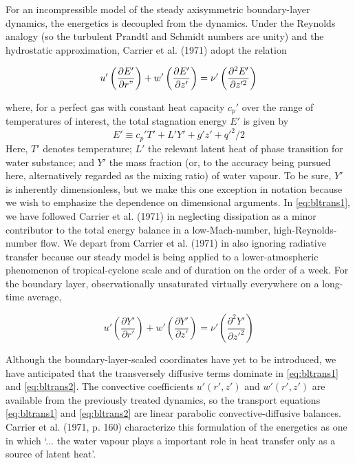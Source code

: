 \documentclass[preprint, prX]{revtex4}
\newcommand{\ppd}[2]{\left(\frac{\partial#1}{\partial#2}\right)}
\begin{document}
For an incompressible model of the steady axisymmetric boundary-layer dynamics, the energetics is decoupled from the dynamics. Under the Reynolds analogy (so the turbulent Prandtl and Schmidt numbers are unity) and the hydrostatic approximation, Carrier et al. (1971) adopt the relation

\begin{equation}
u' \ppd{E'}{r"} + w' \ppd{E'}{z'} = \nu'\left( \frac{\partial^2 E'}{\partial z'^2}\right )
\label{eq:bltrans1}
\end{equation}

where, for a perfect gas with constant heat capacity $c_p'$ over the range of temperatures of interest, the total stagnation energy $E'$ is given by
\begin{equation}
E'\equiv c_p'T'+L'Y' + g'z' + q'^2 /2
\end{equation}
Here, $T'$ denotes temperature; $L'$ the relevant latent heat of phase transition for water substance; and $Y'$ the mass fraction (or, to the accuracy being pursued here, alternatively regarded as the mixing ratio) of water vapour. To be sure, $Y'$ is inherently dimensionless, but we make this one exception in notation because we wish to emphasize the dependence on dimensional arguments. In \eqref{eq:bltrans1}, we have followed Carrier et al. (1971) in neglecting dissipation as a minor contributor to the total energy balance in a low-Mach-number, high-Reynolds-number flow. We depart from Carrier et al. (1971) in also ignoring radiative transfer because our steady model is being applied to a lower-atmospheric phenomenon of tropical-cyclone scale and of duration on the order of a week. For the boundary layer, observationally unsaturated virtually everywhere on a long-time average,

\begin{equation}
u' \ppd{Y'}{r'} + w'\ppd{Y'}{z'} = \nu'\left( \frac{\partial^2 Y'}{\partial z'^2}\right )
\label{eq:bltrans2}
\end{equation}

Although the boundary-layer-scaled coordinates have yet to be introduced, we have anticipated that the transversely diffusive terms dominate in \eqref{eq:bltrans1} and \eqref{eq:bltrans2}. The convective coefficients $u'(r', z')$ and $w'(r', z')$ are available from the previously treated dynamics, so the transport equations \eqref{eq:bltrans1} and \eqref{eq:bltrans2} are linear parabolic convective-diffusive balances. Carrier et al. (1971, p. 160) characterize this formulation of the energetics as one in which `... the water vapour plays a important role in heat transfer only as a source of latent heat'.
\end{document}

